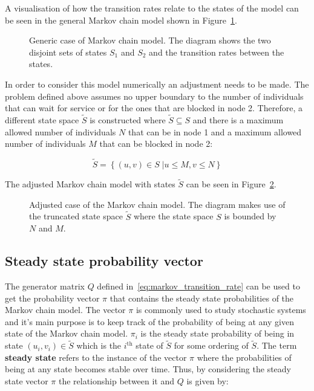 A visualisation of how the transition rates relate to the states of the model
can be seen in the general Markov chain model shown in
Figure~\ref{fig:general_markov_model}.

\begin{figure}[H]
    \centering
    \scalebox{.8}
    {}
    \caption{Generic case of Markov chain model. The diagram shows the
    two disjoint sets of states \(S_1\) and \(S_2\) and the transition rates
    between the states.} 
    \label{fig:general_markov_model}
\end{figure}


In order to consider this model numerically an adjustment needs to be made.
The problem defined above assumes no upper boundary to the number of individuals
that can wait for service or for the ones that are blocked in node 2.
Therefore, a different state space \( \tilde S \) is constructed where
\( \tilde S \subseteq S \) and there is a maximum allowed number of individuals
\(N\) that can be in node 1 and a maximum allowed number of individuals
\(M\) that can be blocked in node 2:

\begin{equation}\label{eq:truncated_state_space}
    \tilde S = \left\{ (u, v) \in S\;| u \leq M, v\leq N \right\}
\end{equation}

The adjusted Markov chain model with states \(\tilde S\) can be seen in
Figure~\ref{fig:adjusted_markov_model}.

\begin{figure}[H]
    \centering
    \scalebox{.8}
    {}
    \caption{Adjusted case of the Markov chain model. The diagram makes use of
    the truncated state space \( \tilde S \) where the state space \(S\) is
    bounded by \(N\) and \(M\).}
    \label{fig:adjusted_markov_model}
\end{figure}


\subsection{Steady state probability vector}
\label{sec:steady_state_probabilities}

The generator matrix \( Q \) defined in~\eqref{eq:markov_transition_rate} can
be used to get the probability vector \( \pi \) that contains the steady state
probabilities of the Markov chain model.
The vector \( \pi \) is commonly used to study stochastic systems and it's main
purpose is to keep track of the probability of being at any given state of
the Markov chain model.
\(\pi_i\) is the steady state probability of being in state \((u_i, v_i) \in
\tilde S\) which is the \(i^{\text{th}}\) state of \(\tilde S\) for some
ordering of \(\tilde S\).
The term \textbf{steady state} refers to the instance of the vector \( \pi \)
where the probabilities of being at any state becomes stable over time.
Thus, by considering the steady state vector \( \pi \) the relationship between
it and \( Q \) is given by:

